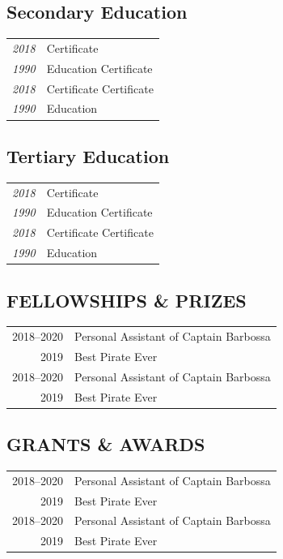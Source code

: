 \documentclass[11pt]{article}
\begin{document}

\subsection{Secondary Education}
\begin{tabular}{>{\itshape}r|l}
    2018 & Certificate \\
    1990 & Education Certificate \\
    2018 & Certificate Certificate\\
    1990 & Education
\end{tabular}

\vspace{1em}

\subsection{Tertiary Education}
\begin{tabular}{>{\itshape}r|l}
    2018 & Certificate \\
    1990 & Education Certificate \\
    2018 & Certificate Certificate\\
    1990 & Education
\end{tabular}


\subsection{FELLOWSHIPS \& PRIZES}
\begin{tabular}{r p{}}
2018--2020 & Personal Assistant of Captain Barbossa \\
2019 & Best Pirate Ever \\
2018--2020 & Personal Assistant of Captain Barbossa \\
2019 & Best Pirate Ever
\end{tabular}




\subsection{GRANTS \& AWARDS}
\begin{tabular}{r p{}}
2018--2020 & Personal Assistant of Captain Barbossa \\
2019 & Best Pirate Ever \\
2018--2020 & Personal Assistant of Captain Barbossa \\
2019 & Best Pirate Ever
\end{tabular}
\end{document}
